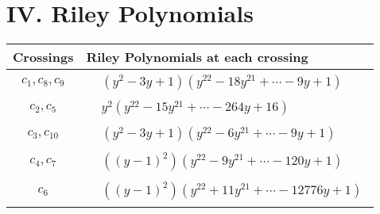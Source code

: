 \documentclass[1p]{elsarticle_modified}
\theoremstyle{definition}
\begin{document}
\centering \section*{ IV. Riley Polynomials}
\begin{tabular}{m{50pt}|m{274pt}}
Crossings & \hspace{64pt}Riley Polynomials at each crossing \\
\hline $$\begin{aligned}c_{1},c_{8},c_{9}\end{aligned}$$&$\begin{aligned}
&(y^2-3 y+1)(y^{22}-18 y^{21}+\cdots-9 y+1)
\end{aligned}$\\
\hline $$\begin{aligned}c_{2},c_{5}\end{aligned}$$&$\begin{aligned}
&y^2(y^{22}-15 y^{21}+\cdots-264 y+16)
\end{aligned}$\\
\hline $$\begin{aligned}c_{3},c_{10}\end{aligned}$$&$\begin{aligned}
&(y^2-3 y+1)(y^{22}-6 y^{21}+\cdots-9 y+1)
\end{aligned}$\\
\hline $$\begin{aligned}c_{4},c_{7}\end{aligned}$$&$\begin{aligned}
&((y-1)^2)(y^{22}-9 y^{21}+\cdots-120 y+1)
\end{aligned}$\\
\hline $$\begin{aligned}c_{6}\end{aligned}$$&$\begin{aligned}
&((y-1)^2)(y^{22}+11 y^{21}+\cdots-12776 y+1)
\end{aligned}$\\
\hline
\end{tabular}
\vskip 2pc
\end{document}
